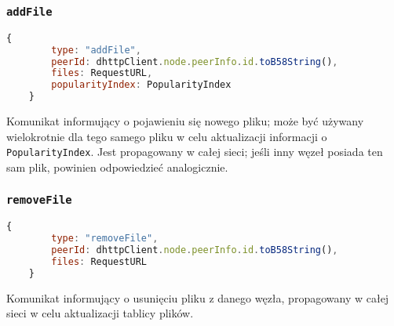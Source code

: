 % 

\subsubsection{\texttt{addFile}}
\begin{lstlisting}[language=javascript]
    {
        type: "addFile",
        peerId: dhttpClient.node.peerInfo.id.toB58String(),
        files: RequestURL,
        popularityIndex: PopularityIndex
    }
\end{lstlisting}

Komunikat informujący o pojawieniu się nowego pliku; może być używany wielokrotnie dla tego samego pliku w celu aktualizacji informacji o \texttt{PopularityIndex}. Jest propagowany w całej sieci; jeśli inny węzeł posiada ten sam plik, powinien odpowiedzieć analogicznie.


% 

\subsubsection{\texttt{removeFile}}
\begin{lstlisting}[language=javascript]
    {
        type: "removeFile",
        peerId: dhttpClient.node.peerInfo.id.toB58String(),
        files: RequestURL
    }
\end{lstlisting}

Komunikat informujący o usunięciu pliku z danego węzła, propagowany w całej sieci w celu aktualizacji tablicy plików.
